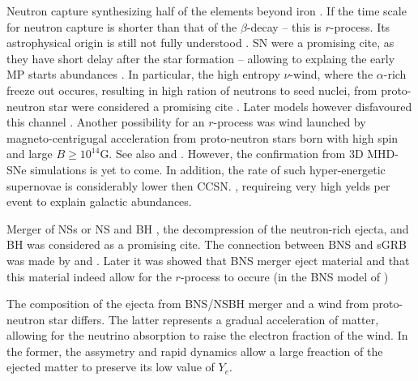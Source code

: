 \documentclass[11pt,a4paper,headinclude=true,DIV=14,BCOR=8mm,chapterprefix,listof=totoc,twoside,openright,abstracton]{scrbook}
\begin{document}
Neutron capture synthesizing half of the elements beyond iron \cite{Burbidge et al (1957) and Cameron (1957)}.
If the time scale for neutron capture is shorter than that of the $\beta$-decay -- this is $r$-process. Its astrophysical origin is still not fully understood \cite{(e.g., Qian and Wasserburg 2007; Arnould et al 2007; Thielemann et al 2011}. 
SN were a promising cite, as they have short delay after the star formation -- allowing to explaing the early MP starts abundances \cite{(Mathews et al 1992; Sneden et al 2008)}. In particular, the high entropy $\nu$-wind, where the $\alpha$-rich freeze out occures, resulting in high ration of neutrons to seed nuclei, from proto-neutron star were considered a promising cite \cite{(Duncan et al 1986; Qian and Woosley 1996)}. 
Later models however disfavoured this channel \cite{(Thompson et al 2001; Arcones et al 2007; Fischer et al 2010; Huudepohl et al 2010; Roberts et al 2010; Martinnz-Pinedo et al 2012; Roberts et al 2012)}. 
Another possibility for an $r$-process was wind launched by magneto-centrigugal acceleration from proto-neutron stars born with high spin and large $B\geq10^{14}$G. \cite{(Thompson et al 2004)} See also \cite{(Winteler et al 2012)} and \cite{(Thompson 2003; Metzger et al 2007; Vlasov et al 2014)}. However, the confirmation from 3D MHD-SNe simulations is yet to come. In addition, the rate of such hyper-energetic supernovae is considerably lower then CCSN. \cite{(Podsiadlowski et al 2004)}, requireing very high yelds per event to explain galactic abundances.

Merger of NSs or NS \cite{Meyer 1989). Symbalisty and Schramm (1982)} and BH \cite{(Hulse and Taylor 1975), Lattimer and Schramm (1974, 1976)}, the decompression of the neutron-rich ejecta, and BH was considered as a promising cite.
The connection between BNS and sGRB was made by \cite{Blinnikov et al (1984)} and \cite{Paczynski (1986)}. 
Later it was showed that BNS merger eject material \cite{Davies et al (1994)} and that this material indeed allow for the $r$-process to occure \cite{Freiburghaus et al (1999)} (in the BNS model of \cite{(Rosswog et al 1999)})

The composition of the ejecta from BNS/NSBH merger and a wind from proto-neutron star differs. The latter represents a gradual acceleration of matter, allowing for the neutrino absorption to raise the electron fraction of the wind. In the former, the assymetry and rapid dynamics allow a large freaction of the ejected matter to preserve its low value of $Y_e$.
\end{document}
